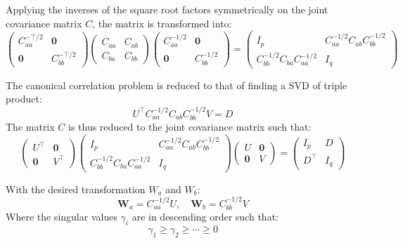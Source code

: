 Applying the inverses of the square root factors symmetrically on the joint covariance matrix $C$, the matrix is transformed into:
\begin{equation}
\begin{pmatrix}
    C_{aa}^{-\top/2} & {\mathbf 0}\\
    {\mathbf 0} & C_{bb}^{-\top/2}
    \end{pmatrix}
    \begin{pmatrix}
    C_{aa} & C_{ab}\\
    C_{ba} & C_{bb}
    \end{pmatrix}
    \begin{pmatrix}
    C_{aa}^{-1/2} & {\mathbf 0}\\
    {\mathbf 0} & C_{bb}^{-1/2}
    \end{pmatrix}
    =
    \begin{pmatrix}
    I_p & C_{aa}^{-1/2}C_{ab}C_{bb}^{-1/2}\\
    C_{bb}^{-1/2}C_{ba}C_{aa}^{-1/2} & I_q
\end{pmatrix}
\end{equation}

The canonical correlation problem is reduced to that of finding a SVD of triple product:
\begin{equation}
    U^{\top} C_{aa}^{-1/2}C_{ab}C_{bb}^{-1/2} V = D
\end{equation}
The matrix $C$ is thus reduced to the joint covariance matrix such that:
\begin{equation}
    \begin{pmatrix}
        U^\top & {\mathbf 0}\\
        {\mathbf 0} & V^\top
    \end{pmatrix}
    \begin{pmatrix}
        I_p & C_{aa}^{-1/2}C_{ab}C_{bb}^{-1/2}\\
        C_{bb}^{-1/2}C_{ba}C_{aa}^{-1/2} & I_q
    \end{pmatrix}
    \begin{pmatrix}
        U & {\mathbf 0}\\
        {\mathbf 0} & V
    \end{pmatrix} = 
    \begin{pmatrix}
    I_p & D\\
    D^\top & I_q
    \end{pmatrix}
\end{equation}

With the desired transformation $W_a$ and $W_b$:
\begin{equation}
    \mathbf{W}_a = C_{aa}^{-1/2} U, \quad \mathbf{W}_b = C_{bb}^{-1/2}V
\end{equation}
Where the singular values $\gamma_i$ are in descending order such that:
\begin{equation}
    \gamma_1 \geq \gamma_2 \geq \cdots \geq 0    
\end{equation}

